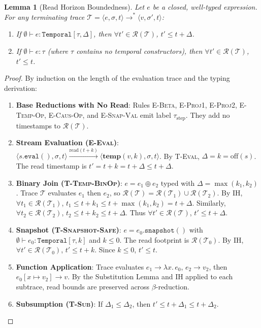 \documentclass[11pt,a4paper]{article}
\theoremstyle{definition}
\theoremstyle{plain}
\newtheorem{lemma}{Lemma}[section]
\newcommand{\ty}[1]{\texttt{#1}}
\newcommand{\step}[1]{\xrightarrow{#1}}
\newcommand{\Temp}{\ty{Temporal}}
\begin{document}
\begin{lemma}[Read Horizon Boundedness]
\label{lem:read-bound}
Let $e$ be a closed, well-typed expression. For any terminating trace $\mathcal{T} = \langle e, \sigma, t \rangle \step{}^* \langle v, \sigma', t \rangle$:
\begin{enumerate}[itemsep=2pt]
  \item If $\emptyset \vdash e : \Temp[\tau, \Delta]$, then $\forall t' \in \mathcal{R}(\mathcal{T})$, $t' \le t + \Delta$.
  \item If $\emptyset \vdash e : \tau$ (where $\tau$ contains no temporal constructors), then $\forall t' \in \mathcal{R}(\mathcal{T})$, $t' \le t$.
\end{enumerate}
\end{lemma}
\begin{proof}
By induction on the length of the evaluation trace and the typing derivation:
\begin{enumerate}[leftmargin=1.5em]
  \item \textbf{Base Reductions with No Read}: Rules \textsc{E-Beta}, \textsc{E-Proj1}, \textsc{E-Proj2}, \textsc{E-Temp-Op}, \textsc{E-Caus-Op}, and \textsc{E-Snap-Val} emit label $\tau_{\text{step}}$. They add no timestamps to $\mathcal{R}(\mathcal{T})$.
  \item \textbf{Stream Evaluation (\textsc{E-Eval})}: $\langle s.\ty{eval}(), \sigma, t \rangle \step{\text{read}(t + k)} \langle \mathbf{temp}(v, k), \sigma, t \rangle$.
    By \textsc{T-Eval}, $\Delta = k = \text{off}(s)$. The read timestamp is $t' = t + k = t + \Delta \le t + \Delta$.
  \item \textbf{Binary Join (\textsc{T-Temp-BinOp})}: $e = e_1 \oplus e_2$ typed with $\Delta = \max(k_1, k_2)$.
    Trace $\mathcal{T}$ evaluates $e_1$ then $e_2$, so $\mathcal{R}(\mathcal{T}) = \mathcal{R}(\mathcal{T}_1) \cup \mathcal{R}(\mathcal{T}_2)$.
    By IH, $\forall t_1 \in \mathcal{R}(\mathcal{T}_1)$, $t_1 \le t + k_1 \le t + \max(k_1, k_2) = t + \Delta$.
    Similarly, $\forall t_2 \in \mathcal{R}(\mathcal{T}_2)$, $t_2 \le t + k_2 \le t + \Delta$. Thus $\forall t' \in \mathcal{R}(\mathcal{T})$, $t' \le t + \Delta$.
  \item \textbf{Snapshot (\textsc{T-Snapshot-Safe})}: $e = e_0.\ty{snapshot}()$ with $\emptyset \vdash e_0 : \Temp[\tau, k]$ and $k \le 0$.
    The read footprint is $\mathcal{R}(\mathcal{T}_0)$. By IH, $\forall t' \in \mathcal{R}(\mathcal{T}_0)$, $t' \le t + k$. Since $k \le 0$, $t' \le t$.
  \item \textbf{Function Application}: Trace evaluates $e_1 \to \lambda x.\, e_0$, $e_2 \to v_2$, then $e_0[x \mapsto v_2] \to v$.
    By the Substitution Lemma and IH applied to each subtrace, read bounds are preserved across $\beta$-reduction.
  \item \textbf{Subsumption (\textsc{T-Sub})}: If $\Delta_1 \le \Delta_2$, then $t' \le t + \Delta_1 \le t + \Delta_2$. \qedhere
\end{enumerate}
\end{proof}
\end{document}
